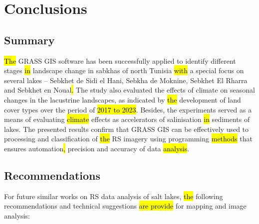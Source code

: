 \documentclass[land,article,submit,pdftex,moreauthors]{Definitions/mdpi}
\begin{document}
\section{Conclusions}

\subsection{Summary}

\hl{The }GRASS GIS software has been successfully applied to identify different stages \hl{in }landscape change in sabkhas of north Tunisia \hl{with} a special focus on several lakes -- Sebkhet de Sidi el Hani, Sebkha de Moknine, Sebkhet El Rharra and Sebkhet en Noual\hl{. }The study also evaluated the effects of climate on seasonal changes in the lacustrine landscapes, as indicated by \hl{the }development of land cover types over the period of \hl{2017 to 2023}. Besides, the experiments served as a means of evaluating \hl{climate} effects as accelerators of salinisation\hl{ in }sediments of lakes. The presented results confirm that GRASS GIS can be effectively used to processing and classification of \hl{the }RS imagery using programming \hl{methods} that ensures automation\hl{, }precision and accuracy of data \hl{analysis}. 

\subsection{Recommendations}

For future similar works on RS data analysis of salt lakes, \hl{the} following recommendations and technical suggestions \hl{are provide }for mapping and image analysis:
\end{document}
